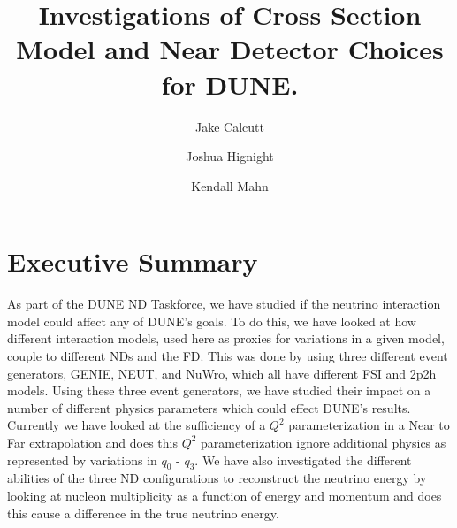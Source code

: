 \documentclass[12pt]{article}
\title{Investigations of Cross Section Model and Near Detector Choices for DUNE.}
\date{}
\begin{document}
\author[1]{Jake Calcutt}
\author[1]{Joshua Hignight}
\author[1]{Kendall Mahn}


\maketitle
\thispagestyle{fancy}

\section{Executive Summary}
As part of the DUNE ND Taskforce, we have studied if the neutrino interaction model could affect any of DUNE's goals.
To do this, we have looked at how different interaction models, used here as proxies for variations in a given model, couple to different NDs and the FD.  
This was done by using three different event generators, GENIE, NEUT, and NuWro, which all have different FSI and 2p2h models.  
Using these three event generators, we have studied their impact on a number of different physics parameters which could effect DUNE's results. 
Currently we have looked at the sufficiency of a $Q^2$ parameterization in a Near to Far extrapolation and does this $Q^2$ parameterization ignore additional physics as represented by variations in $q_0 \textrm{ - } q_3$.
We have also investigated the different abilities of the three ND configurations to reconstruct the neutrino energy by looking at nucleon multiplicity as a function of energy and momentum and does this cause a difference in the true neutrino energy.
\end{document}
